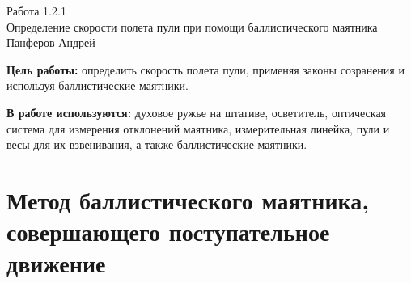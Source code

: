 




\begin{center}
  \LARGE{Работа 1.2.1}\\[0.2cm]
  \LARGE{Определение скорости полета пули при помощи баллистического маятника}\\[0.2cm]
  \large{Панферов Андрей}\\[0.2cm]
\end{center}

\textbf{Цель работы:} определить скорость полета пули, применяя законы созранения и используя баллистические маятники.

\textbf{В работе используются:} духовое ружье на штативе, осветитель, оптическая система для измерения отклонений маятника, измерительная линейка, пули и весы для их взвенивания, а также баллистические маятники.

\section{Метод баллистического маятника, совершающего поступательное движение}

